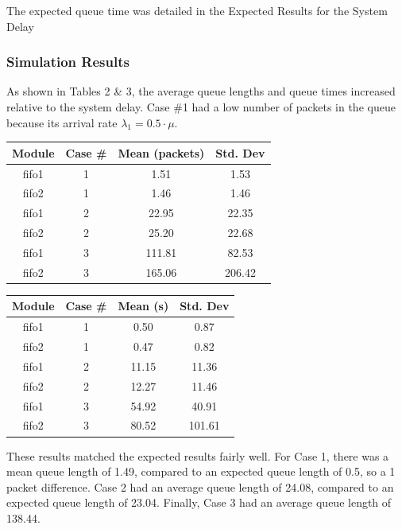 \documentclass{article}
\begin{document}
The expected queue time was detailed in the Expected Results for the System Delay
\subsubsection*{Simulation Results}
As shown in Tables 2 \& 3, the average queue lengths and queue times increased relative to the system delay.  
Case \#1 had a low number of packets in the queue because its arrival rate $\lambda_1 = 0.5 \cdot \mu$.

\begin{minipage}{0.5\textwidth}
	\centering
	\begin{tabular}{|c|c|c|c|} \hline
		\textbf{Module} & \textbf{Case \#} & \textbf{Mean (packets)} & \textbf{Std. Dev} \\ \hline
	 fifo1 & 1 & 1.51 & 1.53 \\ \hline
	 fifo2 & 1 & 1.46 & 1.46 \\ \hline
	 fifo1 & 2 & 22.95 & 22.35 \\ \hline
	 fifo2 & 2 & 25.20 & 22.68 \\ \hline
	 fifo1 & 3 & 111.81 & 82.53 \\ \hline
	 fifo2 & 3 & 165.06 & 206.42 \\ \hline
	\end{tabular}
	\label{qlen}
\end{minipage}  
\begin{minipage}{0.5\textwidth}
	\centering
	\begin{tabular}{|c|c|c|c|} \hline
		\textbf{Module} & \textbf{Case \#} & \textbf{Mean (s)} & \textbf{Std. Dev} \\ \hline
		fifo1 & 1 & 0.50 & 0.87 \\ \hline
		fifo2 & 1 & 0.47 & 0.82 \\ \hline
		fifo1 & 2 & 11.15 & 11.36 \\ \hline
		fifo2 & 2 & 12.27 & 11.46 \\ \hline
		fifo1 & 3 & 54.92 & 40.91 \\ \hline
		fifo2 & 3 & 80.52 & 101.61 \\ \hline
	\end{tabular}
	\label{qTime}
\end{minipage}

These results matched the expected results fairly well.
For Case 1, there was a mean queue length of 1.49, compared to an expected queue length of 0.5, so a 1 packet difference.
Case 2 had an average queue length of 24.08, compared to an expected queue length of 23.04.
Finally, Case 3 had an average queue length of 138.44.
\end{document}
